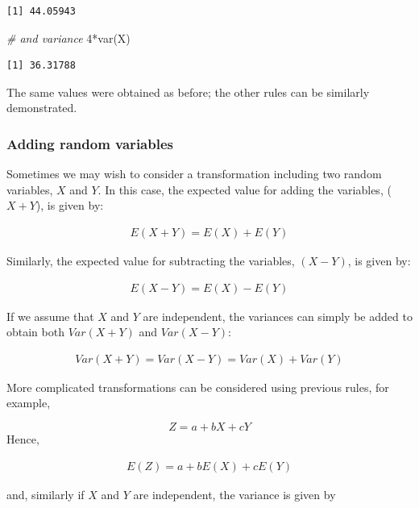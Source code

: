\documentclass[
  oneside]{krantz}
\newenvironment{Shaded}{\begin{snugshade}}{\end{snugshade}}
\newcommand{\CommentTok}[1]{\textcolor[rgb]{0.56,0.35,0.01}{\textit{#1}}}
\newcommand{\DecValTok}[1]{\textcolor[rgb]{0.00,0.00,0.81}{#1}}
\newcommand{\FunctionTok}[1]{\textcolor[rgb]{0.00,0.00,0.00}{#1}}
\newcommand{\NormalTok}[1]{#1}
\newcommand{\SpecialCharTok}[1]{\textcolor[rgb]{0.00,0.00,0.00}{#1}}
\begin{document}
\begin{verbatim}
[1] 44.05943
\end{verbatim}

\begin{Shaded}
\begin{Highlighting}[]
\CommentTok{\# and variance}
\DecValTok{4}\SpecialCharTok{*}\FunctionTok{var}\NormalTok{(X)}
\end{Highlighting}
\end{Shaded}

\begin{verbatim}
[1] 36.31788
\end{verbatim}

The same values were obtained as before; the other rules can be similarly demonstrated.

\hypertarget{adding-random-variables}{%
\subsubsection{Adding random variables}\label{adding-random-variables}}

Sometimes we may wish to consider a transformation including two random variables, \(X\) and \(Y\). In this case, the expected value for adding the variables, (\(X + Y\)), is given by:

\begin{align}
E(X + Y) = E(X) + E(Y)
\end{align}

Similarly, the expected value for subtracting the variables, \((X-Y)\), is given by:

\begin{align}
E(X - Y) = E(X) - E(Y)
\end{align}

If we assume that \(X\) and \(Y\) are independent, the variances can simply be added to obtain both \(Var(X+Y)\) and \(Var(X-Y)\):

\begin{align}
Var(X+Y) = Var(X-Y) = Var(X) + Var(Y)
\end{align}

More complicated transformations can be considered using previous rules, for example,

\[Z = a + bX + cY\]
Hence,

\begin{align}
E(Z) = a + bE(X) + cE(Y)
\end{align}

and, similarly if \(X\) and \(Y\) are independent, the variance is given by
\end{document}
